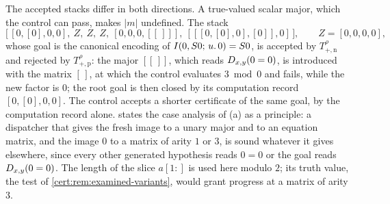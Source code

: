 The accepted stacks differ in both directions. A true-valued scalar major, which the
control can pass, makes $\lvert m\rvert$ undefined. The stack
\[
\bigl[\,[0,[0],0,0],\ Z,\ Z,\ Z,\ [0,0,0,[[\,]]],\ [[[0,[0],0],[0]],0]\,\bigr],
\qquad Z=[0,0,0,0],
\]
whose goal is the canonical encoding of $I(0,S 0;\,u.\,0)=S 0$, is accepted
by $T^{\rho}_{+,\mathrm n}$ and rejected by $T^{\rho}_{+,\mathrm p}$: the major
$[[\,]]$, which reads $D_{x,y}(0=0)$, is introduced with the matrix $[\,]$, at which the
control evaluates $3\bmod 0$ and fails, while the new factor is $0$; the root goal is
then closed by its computation record $[0,[0],0,0]$. The control accepts a shorter
certificate of the same goal, by the computation record alone. 
states the case analysis of (a) as a principle: a dispatcher that gives the fresh
image to a unary major and to an equation matrix, and the image $0$ to a matrix of
arity $1$ or $3$, is sound whatever it gives elsewhere, since every other generated
hypothesis reads $0=0$ or the goal reads $D_{x,y}(0=0)$. The length of the slice
$a[1{:}]$ is used here modulo $2$; its truth value, the test of
\cref{cert:rem:examined-variants}, would grant progress at a matrix of arity $3$.

